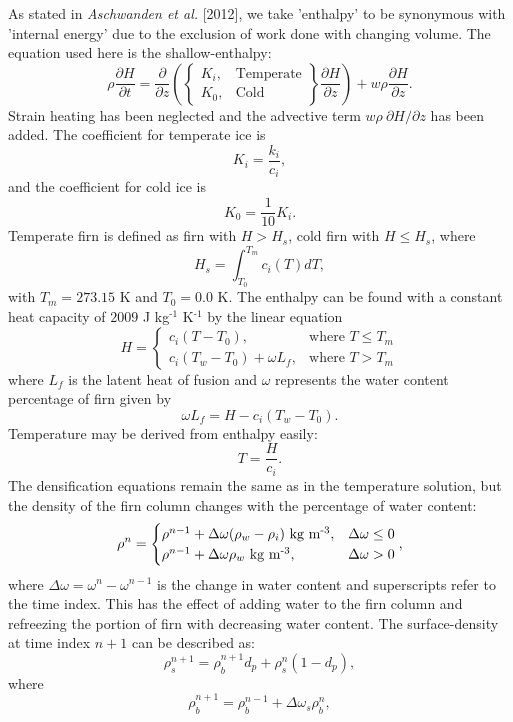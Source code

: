 \documentclass{article}%
\newcommand{\sups}[1]{\ensuremath{^{\textrm{#1}}}}
\begin{document}
As stated in \emph{Aschwanden et al.} [2012], we take 'enthalpy' to be synonymous with 'internal energy' due to the exclusion of work done with changing volume.  The equation used here is the shallow-enthalpy:
	$$
  \rho \frac{\partial H}{\partial t} = \frac{\partial}{\partial z} 
    \left( 
      \begin{Bmatrix}
        K_i, &\text{Temperate}\\
        K_0, &\text{Cold}
      \end{Bmatrix}
      \frac{\partial H}{\partial z} 
    \right) + w \rho \frac{\partial H}{\partial z}.
  $$
Strain heating has been neglected and the advective term $w \rho\ \partial H / \partial z$ has been added.  The coefficient for temperate ice is 
  $$K_i = \frac{k_i}{c_i},$$
and the coefficient for cold ice is
  $$K_0 = \frac{1}{10}K_i.$$
Temperate firn is defined as firn with $H > H_s$, cold firn with $H \leq H_s$, where
  $$H_s = \int_{T_0}^{T_m}{c_i(T)}dT,$$ 
with $T_m = 273.15$ K and $T_0 = 0.0$ K.  The enthalpy can be found with a constant heat capacity of $2009$ J kg\sups{-1} K\sups{-1} by the linear equation
  $$
  H = 
  \begin{cases}
    c_i(T - T_0), &\text{where } T \leq T_m\\
    c_i(T_w - T_0) + \omega L_f,  &\text{where } T > T_m
  \end{cases}
  $$
where $L_f$ is the latent heat of fusion and $\omega$ represents the water content percentage of firn given by
  $$\omega L_f = H - c_i(T_w - T_0).$$
Temperature may be derived from enthalpy easily:
  $$T = \frac{H}{c_i}.$$
The densification equations remain the same as in the temperature solution, but the density of the firn column changes with the percentage of water content:
  $$
  \rho^n = 
  \begin{cases}
    \rho^{n-1} + \Delta\omega(\rho_w - \rho_i)\ \text{kg m\sups{-3}},  
      &\Delta\omega \leq 0\\
    \rho^{n-1} + \Delta\omega\rho_w\ \text{kg m\sups{-3}}, 
      &\Delta\omega > 0
  \end{cases},
  $$
where $\Delta\omega = \omega^n - \omega^{n-1}$ is the change in water content and superscripts refer to the time index.  This has the effect of adding water to the firn column and refreezing the portion of firn with decreasing water content.  The surface-density at time index $n+1$ can be described as: 
  $$\rho_s^{n+1} = \rho_{\dot{b}}^{n+1} d_p + \rho_s^{n} (1 - d_p),$$
where
  $$\rho_{\dot{b}}^{n+1} = \rho_{\dot{b}}^{n-1} + \Delta \omega_s \rho_{\dot{b}}^n,$$
\end{document}
